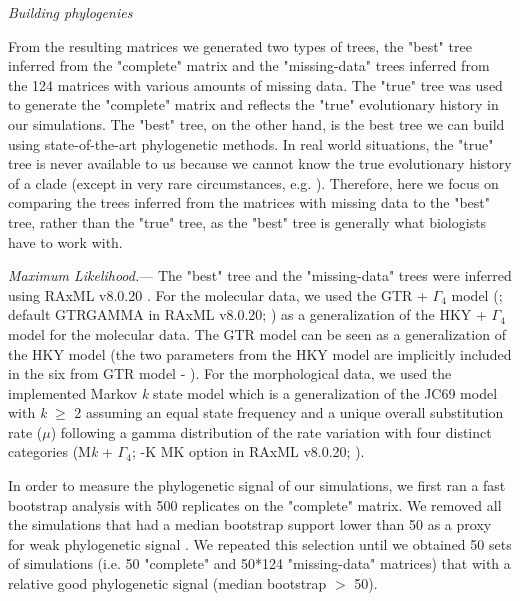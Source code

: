 \documentclass[12pt,letterpaper]{article}
\renewcommand{\subsection}[1]{%
\bigskip
\begin{center}
\begin{large}
\normalfont\itshape #1
\end{large}
\end{center}}
\renewcommand{\subsubsection}[1]{%
\vspace{2ex}
\noindent
\textit{#1.}---}
\begin{document}

\subsection{Building phylogenies}
From the resulting matrices we generated two types of trees, the "best" tree inferred from the "complete" matrix and the "missing-data" trees inferred from the 124 matrices with various amounts of missing data.
The "true" tree was used to generate the "complete" matrix and reflects the "true" evolutionary history in our simulations.
The "best" tree, on the other hand, is the best tree we can build using state-of-the-art phylogenetic methods.
In real world situations, the "true" tree is never available to us because we cannot know the true evolutionary history of a clade (except in very rare circumstances, e.g. \citealt{rozen2005}).
Therefore, here we focus on comparing the trees inferred from the matrices with missing data to the "best" tree, rather than the "true" tree, as the "best" tree is generally what biologists have to work with.

\subsubsection{Maximum Likelihood}
The "best" tree and the "missing-data" trees were inferred using RAxML v8.0.20 \citep{Stamatakis21012014}.
For the molecular data, we used the GTR + $\Gamma_4$ model (\citealt{tavare1986}; default GTRGAMMA in RAxML v8.0.20; \citealt{Stamatakis21012014}) as a generalization of the HKY + $\Gamma_4$ model \citep{HKY85} for the molecular data.
The GTR model can be seen as a generalization of the HKY model (the two parameters from the HKY model are implicitly included in the six from GTR model - \citealt{stamatakisa2008}).
For the morphological data, we used the implemented Markov \textit{k} state model \citep{lewisa2001} which is a generalization of the JC69 model \citep{jc69} with \textit{k} $\geq$ 2 assuming an equal state frequency and a unique overall substitution rate ($\mu$) following a gamma distribution of the rate variation with four distinct categories (M\textit{k} + $\Gamma_4$; -K MK option in RAxML v8.0.20; \citealt{Stamatakis21012014}).

In order to measure the phylogenetic signal of our simulations, we first ran a fast bootstrap analysis with 500 replicates on the "complete" matrix.
We removed all the simulations that had a median bootstrap support lower than 50 as a proxy for weak phylogenetic signal \citep{zanderminimal2004}.
We repeated this selection until we obtained 50 sets of simulations (i.e. 50 "complete" and 50*124 "missing-data" matrices) that with a relative good phylogenetic signal (median bootstrap $>$ 50).
\end{document}
